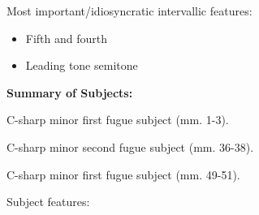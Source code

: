 Most important/idiosyncratic intervallic features:

\begin{itemize}
\tightlist
\item
  Fifth and fourth
\item
  Leading tone semitone
\end{itemize}

\textbf{Summary of Subjects:}



\begin{Example}[H]
    \begin{center}
    \caption{ C-sharp minor first fugue subject (mm. 1-3). }
    \end{center}
\end{Example}
    


\begin{Example}[H]
    \begin{center}
    \caption{ C-sharp minor second fugue subject (mm. 36-38). }
    \end{center}
\end{Example}
    


\begin{Example}[H]
    \begin{center}
    \caption{ C-sharp minor first fugue subject (mm. 49-51). }
    \end{center}
\end{Example}
    

    \begin{center}
    \end{center}
    

    \begin{center}
    \end{center}
    
    Subject features:

